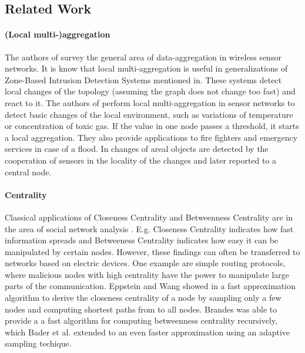 \documentclass[11pt]{article}
\begin{document}
\subsection{Related Work}

\paragraph{(Local multi-)aggregation}
The authors of \cite{rajagopalan8data} survey the general area of data-aggregation in wireless sensor networks.
It is know \cite{anantvalee2007survey} that local multi-aggregation is useful in generalizations of Zone-Based Intrusion Detection Systems mentioned in. These systems detect local changes of the topology (assuming the graph does not change too fast) and react to it. The authors of \cite{Jiang:2008:DBT:1463434.1463440} perform local multi-aggregation in sensor networks to detect basic changes of the local environment, such as variations of temperature or concentration of toxic gas. If the value in one node passes a threshold, it starts a local aggregation. They also provide applications to fire fighters and emergency services in case of a flood. In \cite{Jiang:2008:DBT:1463434.1463440} changes of areal objects are detected by the cooperation of sensors in the locality of the changes and later reported to a central node.

\paragraph{Centrality}
Classical applications of Closeness Centrality \cite{bavelas1950communication,beauchamp1965} and Betweenness Centrality \cite{freeman1977} are in the area of social network analysis \cite{wasserman1994social}. E.g. Closeness Centrality indicates how fast information spreads and Betweeness Centrality indicates how easy it can be manipulated by certain nodes. However, these findings can often be transferred to networks based on electric devices. One example are simple routing protocols, where malicious nodes with high centrality have the power to manipulate large parts of the communication. Eppstein and Wang showed in \cite{eppstein:2001:fastCCapprox} a fast approximation algorithm to derive the closeness centrality of a node by sampling only a few nodes  and computing shortest paths from  to all nodes. Brandes \cite{brandes:2001:fasterBCalgo} was able to provide a a fast algorithm for computing betweenness centrality recursively, which Bader et al. \cite{bader:2007:BCapprox} extended to an even faster approximation using an adaptive sampling techique.
\end{document}
